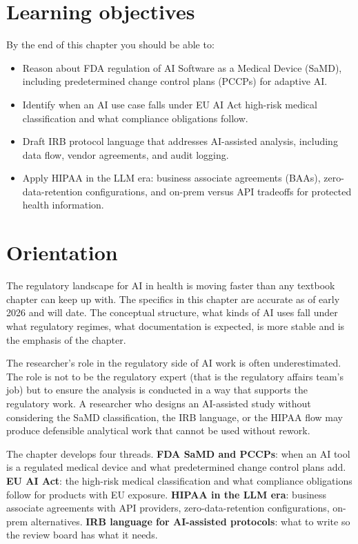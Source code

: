 \documentclass[
  letterpaper,
  11pt]{scrbook}
\providecommand{\tightlist}{%
  \setlength{\itemsep}{0pt}\setlength{\parskip}{0pt}}
\begin{document}
\section{Learning objectives}\label{learning-objectives-11}

By the end of this chapter you should be able to:

\begin{itemize}
\tightlist
\item
  Reason about FDA regulation of AI Software as a Medical Device (SaMD),
  including predetermined change control plans (PCCPs) for adaptive AI.
\item
  Identify when an AI use case falls under EU AI Act high-risk medical
  classification and what compliance obligations follow.
\item
  Draft IRB protocol language that addresses AI-assisted analysis,
  including data flow, vendor agreements, and audit logging.
\item
  Apply HIPAA in the LLM era: business associate agreements (BAAs),
  zero-data-retention configurations, and on-prem versus API tradeoffs
  for protected health information.
\end{itemize}

\section{Orientation}\label{orientation-11}

The regulatory landscape for AI in health is moving faster than any
textbook chapter can keep up with. The specifics in this chapter are
accurate as of early 2026 and will date. The conceptual structure, what
kinds of AI uses fall under what regulatory regimes, what documentation
is expected, is more stable and is the emphasis of the chapter.

The researcher's role in the regulatory side of AI work is often
underestimated. The role is not to be the regulatory expert (that is the
regulatory affairs team's job) but to ensure the analysis is conducted
in a way that supports the regulatory work. A researcher who designs an
AI-assisted study without considering the SaMD classification, the IRB
language, or the HIPAA flow may produce defensible analytical work that
cannot be used without rework.

The chapter develops four threads. \textbf{FDA SaMD and PCCPs}: when an
AI tool is a regulated medical device and what predetermined change
control plans add. \textbf{EU AI Act}: the high-risk medical
classification and what compliance obligations follow for products with
EU exposure. \textbf{HIPAA in the LLM era}: business associate
agreements with API providers, zero-data-retention configurations,
on-prem alternatives. \textbf{IRB language for AI-assisted protocols}:
what to write so the review board has what it needs.
\end{document}
